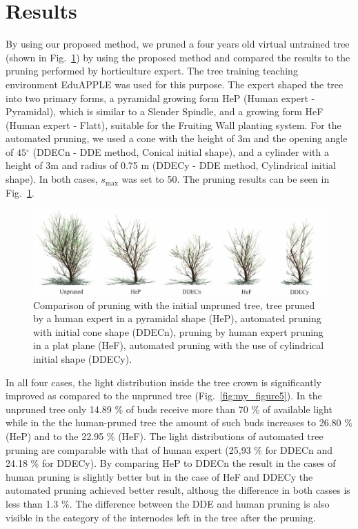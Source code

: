 
\section{Results}
By using our proposed method, we pruned a four years old virtual
untrained tree (shown in Fig.~\ref{fig:my_figure4}) by using the proposed method and
compared the results to the pruning performed by horticulture expert.
The tree training teaching environment EduAPPLE \cite{kohek_eduapple:_2015} was used for
this purpose. The expert shaped the tree into two primary forms, a
pyramidal growing form HeP (Human expert - Pyramidal), which is similar to a Slender Spindle, and a
growing form HeF (Human expert - Flatt), suitable for the Fruiting Wall planting system. For
the automated pruning, we used a cone with the height of \(3\)m and the
opening angle of \(45{^\circ}\) (DDECn - DDE method, Conical initial shape), and a cylinder with a height of
3m and radius of 0.75 m (DDECy - DDE method, Cylindrical initial shape). In both cases, \(s_{\mathrm{\max}}\)
was set to 50. The pruning results can be seen in Fig.~\ref{fig:my_figure4}.
\begin{figure}[hbt]
    \centering
    \includegraphics[width=5.4in]{figs/image4.jpeg}
    \caption{Comparison of pruning with the initial unpruned tree,
tree pruned by a human expert in a pyramidal shape (HeP), automated
pruning with initial cone shape (DDECn), pruning by human expert pruning
in a plat plane (HeF), automated pruning with the use of cylindrical
initial shape (DDECy).}
    \label{fig:my_figure4}
\end{figure}

In all four cases, the light distribution inside the tree crown is
significantly improved as compared to the unpruned tree (Fig.~\ref{fig:my_figure5}). In the unpruned
tree only 14.89 \% of buds receive more than 70 \% of available light while in the the human-pruned tree the amount of such buds increases to 26.80 \% (HeP) and to the 22.95 \% (HeF).
The light distributions of automated tree pruning are comparable with
that of human expert (25,93 \% for DDECn and 24.18 \% for DDECy). By comparing HeP to DDECn the result in the cases of human pruning is slightly better but in the case of HeF and DDECy the automated pruning achieved better result, althoug the difference in both casses is less than 1.3 \%. The difference between the DDE
and human pruning is also visible in the category of the internodes left
in the tree after the pruning.

